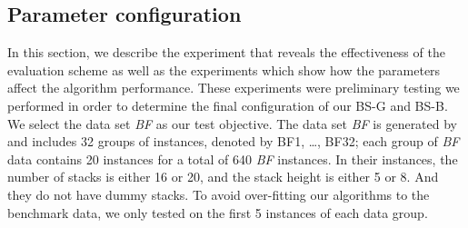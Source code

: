 \documentclass[review,3p,times,authoryear,12pt]{elsarticle}
\begin{document}

\subsection {Parameter configuration}
\label{sub:config}

In this section, we describe the experiment that reveals the effectiveness of the evaluation scheme as well as the experiments which show how the parameters affect the algorithm performance. These experiments were preliminary testing we performed in order to determine the final configuration of our BS-G and BS-B. We select the data set {\em BF} as our test objective. The data set {\em BF} is generated by \cite{BF2012} and includes 32 groups of instances, denoted by BF1, \dots, BF32; each group of {\em BF} data contains 20 instances for a total of 640 {\em BF} instances. In their instances, the number of stacks is either 16 or 20, and the stack height is either 5 or 8. And they do not have dummy stacks. To avoid over-fitting our algorithms to the benchmark data, we only tested on the first 5 instances of each data group.
\end{document}
